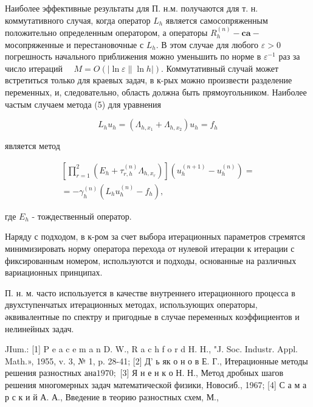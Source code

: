 \documentclass[10pt]{article}
\begin{document}
Наиболее эффективные результаты для П. н.м. получаются для т. н. коммутативного случая, когда оператор $L_{h}$ является самосопряженным положительно определенным оператором, а операторы $R_{h}^{(n)}-\mathbf{c a}-$ мосопряженные и перестановочные с $L_{h}$. В этом случае для любого $\varepsilon>0$ погрешность начального приближения можно уменьшить по норме в $\varepsilon^{-1}$ раз за число итераций $\quad M=O(|\ln \varepsilon \| \ln h|)$. Коммутативный случай может встретиться только для краевых задач, в к-рых можно произвести разделение переменных, и, следовательно, область должна быть прямоугольником. Наиболее частым случаем метода (5) для уравнения



\[

L_{h} u_{h}=\left(\Lambda_{h, x_{1}}+\Lambda_{h, x_{2}}\right) u_{h}=f_{h}

\]



является метод



\[

\begin{gathered}

{\left[\prod_{r=1}^{2}\left(E_{h}+\tau_{r, h}^{(n)} \Lambda_{h, x_{r}}\right)\right]\left(u_{h}^{(n+1)}-u_{h}^{(n)}\right)=} \\

=-\gamma_{h}^{(n)}\left(L_{h} u_{h}^{(n)}-f_{h}\right),

\end{gathered}

\]



где $E_{h}$ - тождественный оператор.



Наряду с подходом, в к-ром за счет выбора итерационных параметров стремятся минимизировать норму оператора перехода от нулевой итерации к итерации с фиксированным номером, используются и подходы, основанные на различных вариационных принципах.



П. н. м. часто используется в качестве внутреннего итерационного процесса в двухступенчатых итерационных методах, использующих операторы, әквивалентные по спектру и пригодные в случае переменных коэффициентов и нелинейных задач.



JIum.: [1] P e a c e m a n D. W., $\mathrm{R}$ a $\mathrm{c}$ h f o r d H. H., "J. Soc. Industr. Appl. Math.», 1955, v. 3, № 1, p. 28-41; [2] Д' ь як о н о в Е. Г., Итерационные методы решения разностных ана$1970 ;$ [3] Я н е н к о Н. Н., Метод дробных шагов решения многомерных задач математической физики, Новосиб., 1967; [4] С а м а р с к и й А. А., Введение в теорию разностных схем, М.,
\end{document}
